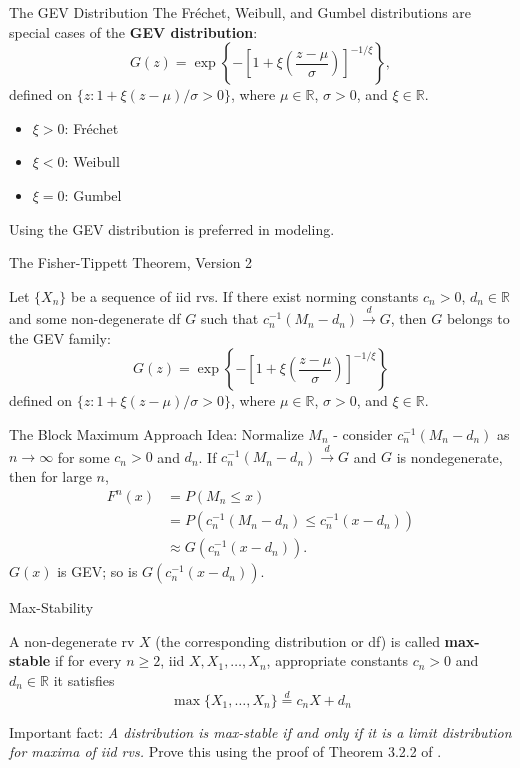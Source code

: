 \documentclass{beamer}
\begin{document}
\begin{frame}{The GEV Distribution}
    The Fr\'{e}chet, Weibull, and Gumbel distributions are special cases of the \textbf{GEV distribution}:
    \[
    G(z) = \exp\left\{-\left[1 + \xi\left(\frac{z - \mu}{\sigma}\right)\right]^{-1 / \xi}\right\},
    \]
    defined on $\{z : 1 + \xi(z - \mu) / \sigma > 0\}$, where $\mu \in \mathbb{R}$, $\sigma > 0$, and $\xi \in \mathbb{R}$.

    \begin{itemize}
        \item $\xi > 0$: Fr\'{e}chet
        \item $\xi < 0$: Weibull
        \item $\xi = 0$: Gumbel
    \end{itemize}

    \medskip

    Using the GEV distribution is preferred in modeling.
\end{frame}

\begin{frame}{The Fisher-Tippett Theorem, Version 2}
    \begin{theorem}
        Let $\{X_n\}$ be a sequence of iid rvs. If there exist norming constants $c_n > 0$, $d_n \in \mathbb{R}$ and some non-degenerate df $G$ such that $c_n^{-1}(M_n - d_n) \xrightarrow{d} G$, then $G$ belongs to the GEV family:
        \[
        G(z) = \exp\left\{-\left[1 + \xi\left(\frac{z - \mu}{\sigma}\right)\right]^{-1 / \xi}\right\}
        \]
        defined on $\{z : 1 + \xi(z - \mu) / \sigma > 0\}$, where $\mu \in \mathbb{R}$, $\sigma > 0$, and $\xi \in \mathbb{R}$.
    \end{theorem}
\end{frame}

\begin{frame}{The Block Maximum Approach}
    Idea: Normalize $M_n$ - consider $c_n^{-1}(M_n - d_n)$ as $n \to \infty$ for some $c_n > 0$ and $d_n$. If $c_n^{-1}(M_n - d_n) \xrightarrow{d} G$ and $G$ is nondegenerate, then for large $n$,
    \begin{align*}
        F^n(x) &= P(M_n \le x) \\
        &= P(c_n^{-1}(M_n - d_n) \le c_n^{-1}(x - d_n)) \\
        &\approx G(c_n^{-1}(x - d_n)).
    \end{align*}
    $G(x)$ is GEV; so is $G(c_n^{-1}(x - d_n))$.
\end{frame}

\begin{frame}{Max-Stability}
    \begin{definition}
        A non-degenerate rv $X$ (the corresponding distribution or df) is called \textbf{max-stable} if for every $n \ge 2$, iid $X, X_1, \ldots, X_n$, appropriate constants $c_n > 0$ and $d_n \in \mathbb{R}$ it satisfies
        \[
        \max\{X_1, \ldots, X_n\} \overset{d}{=} c_n X + d_n
        \]
    \end{definition}
    Important fact: \textit{A distribution is max-stable if and only if it is a limit distribution for maxima of iid rvs.}
    Prove this using the proof of Theorem 3.2.2 of \cite{embrechts_et_al_1997}.
\end{frame}
\end{document}
